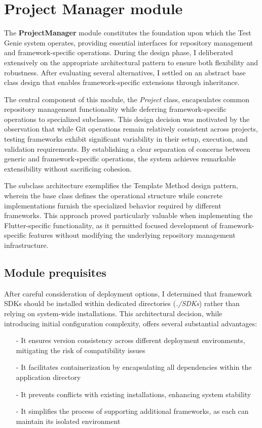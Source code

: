 \section{Project Manager module}

The \textbf{ProjectManager} module constitutes the foundation upon which the Test Genie system operates, providing essential interfaces for repository management and framework-specific operations. During the design phase, I deliberated extensively on the appropriate architectural pattern to ensure both flexibility and robustness. After evaluating several alternatives, I settled on an abstract base class design that enables framework-specific extensions through inheritance.

The central component of this module, the \textit{Project} class, encapsulates common repository management functionality while deferring framework-specific operations to specialized subclasses. This design decision was motivated by the observation that while Git operations remain relatively consistent across projects, testing frameworks exhibit significant variability in their setup, execution, and validation requirements. By establishing a clear separation of concerns between generic and framework-specific operations, the system achieves remarkable extensibility without sacrificing cohesion.

The subclass architecture exemplifies the Template Method design pattern, wherein the base class defines the operational structure while concrete implementations furnish the specialized behavior required by different frameworks. This approach proved particularly valuable when implementing the Flutter-specific functionality, as it permitted focused development of framework-specific features without modifying the underlying repository management infrastructure.

\subsection{Module prequisites}

After careful consideration of deployment options, I determined that framework SDKs should be installed within dedicated directories (\textit{./SDKs}) rather than relying on system-wide installations. This architectural decision, while introducing initial configuration complexity, offers several substantial advantages:

\begin{itemize}
    \item[-] It ensures version consistency across different deployment environments, mitigating the risk of compatibility issues
    \item[-] It facilitates containerization by encapsulating all dependencies within the application directory
    \item[-] It prevents conflicts with existing installations, enhancing system stability
    \item[-] It simplifies the process of supporting additional frameworks, as each can maintain its isolated environment
\end{itemize}

